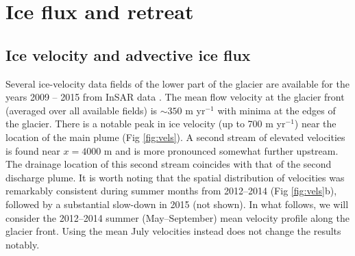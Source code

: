 \documentclass[30pt,letterpaper]{article}
\begin{document}
\section{Ice flux and retreat}

\subsection{Ice velocity and advective ice flux} \label{vels}

Several ice-velocity data fields of the lower part of the glacier are available for the years 2009 -- 2015 from InSAR data \citep{Joughin:uFAgCs4K}. The mean flow velocity at the glacier front (averaged over all available fields) is $\sim 350$ m yr$^{-1}$ with minima at the edges of the glacier. There is a notable peak in ice velocity (up to 700 m yr$^{-1}$) near the location of the main plume (Fig \ref{fig:vels}). A second stream of elevated velocities is found near $x = 4000$ m and is more pronounced somewhat further upstream. The drainage location of this second stream coincides with that of the second discharge plume. It is worth noting that the spatial distribution of velocities was remarkably consistent during summer months from 2012--2014 (Fig  \ref{fig:vels}b), followed by a substantial slow-down in 2015 (not shown). In what follows, we will consider the 2012--2014 summer (May--September) mean velocity profile along the glacier front. Using the mean July velocities instead does not change the results notably. 
\end{document}
